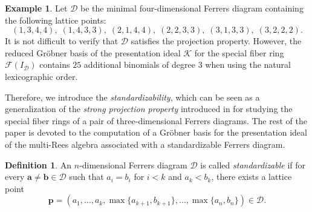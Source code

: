 \documentclass[11pt,a4paper,reqno,dvipsnames]{amsart}
\theoremstyle{plain}
\theoremstyle{definition}
\newtheorem{Assumptions and Discussion}[Theorem]{Assumptions and Discussion}
\newtheorem{Example}[Theorem]{Example}
\newtheorem{Definition}[Theorem]{Definition}
\theoremstyle{remark}
\newcommand\bda{{\bm a}}
\newcommand\bdb{{\bm b}}
\newcommand\bdp{{\bm p}}
\newcommand\calD{\mathcal{D}}
\newcommand\calF{\mathcal{F}}
\newcommand\calK{\mathcal{K}}
\begin{document}
\begin{Example}
    \label{exam:need_SPP}
    Let $\calD$ be the minimal four-dimensional Ferrers diagram containing the following lattice points:
    \[
        (1, 3, 4, 4), \;
        (1, 4, 3, 3), \;
        (2, 1, 4, 4), \;
        (2, 2, 3, 3), \;
        (3,1,3,3), \;
        (3,2,2,2).
    \]
    It is not difficult to verify that $\calD$ satisfies the projection property. However, the reduced Gr\"obner basis of the presentation ideal $\calK$ for the special fiber ring $\calF(I_\calD)$ contains $25$ additional binomials of degree $3$ when using the natural lexicographic order. 
\end{Example}

Therefore, we introduce the \emph{standardizability},
which can be seen as a generalization of the \emph{strong projection property} introduced in \cite{Lin-Shen3DMulti} for studying the special fiber rings of a pair of three-dimensional Ferrers diagrams. 
The rest of the paper is devoted to the computation of a Gr\"obner basis for the presentation ideal of the multi-Rees algebra associated with a standardizable Ferrers diagram.

\begin{Definition}
    \label{def:SDP}
    An $n$-dimensional Ferrers diagram $\calD$ is called \emph{standardizable} if for every $\bda \neq \bdb \in \calD$ such that $a_i=b_i$ for $i<k$ and $a_k<b_k$, there exists a lattice point
    \[
        \bdp=(a_1,\ldots,a_{k},\max\{a_{k+1},b_{k+1}\},\ldots, \max\{a_n,b_n\})\in \calD.
    \]
\end{Definition}
\end{document}
